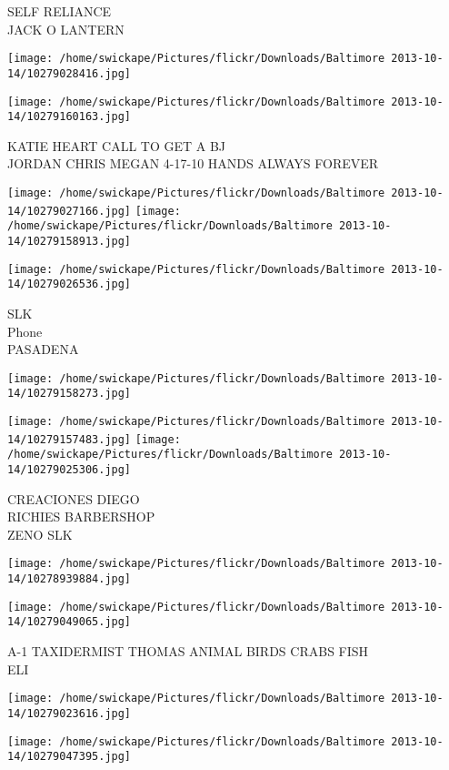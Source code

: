\documentclass[10pt,letterpaper]{article}
\begin{document}
SELF RELIANCE\\
JACK O LANTERN
\pagebreak

\texttt{[image: /home/swickape/Pictures/flickr/Downloads/Baltimore 2013-10-14/10279028416.jpg]}

\vspace{0.25in}
\texttt{[image: /home/swickape/Pictures/flickr/Downloads/Baltimore 2013-10-14/10279160163.jpg]}

KATIE HEART CALL TO GET A BJ\\
JORDAN CHRIS MEGAN 4{-}17{-}10 HANDS ALWAYS FOREVER
\pagebreak

\texttt{[image: /home/swickape/Pictures/flickr/Downloads/Baltimore 2013-10-14/10279027166.jpg]}
\texttt{[image: /home/swickape/Pictures/flickr/Downloads/Baltimore 2013-10-14/10279158913.jpg]}

\texttt{[image: /home/swickape/Pictures/flickr/Downloads/Baltimore 2013-10-14/10279026536.jpg]}

SLK\\
Phone\\
PASADENA
\pagebreak

\texttt{[image: /home/swickape/Pictures/flickr/Downloads/Baltimore 2013-10-14/10279158273.jpg]}

\vspace{0.25in}
\texttt{[image: /home/swickape/Pictures/flickr/Downloads/Baltimore 2013-10-14/10279157483.jpg]}
\texttt{[image: /home/swickape/Pictures/flickr/Downloads/Baltimore 2013-10-14/10279025306.jpg]}

CREACIONES DIEGO\\
RICHIES BARBERSHOP\\
ZENO SLK
\pagebreak

\texttt{[image: /home/swickape/Pictures/flickr/Downloads/Baltimore 2013-10-14/10278939884.jpg]}

\vspace{0.25in}
\texttt{[image: /home/swickape/Pictures/flickr/Downloads/Baltimore 2013-10-14/10279049065.jpg]}

A{-}1 TAXIDERMIST THOMAS ANIMAL BIRDS CRABS FISH\\
ELI
\pagebreak

\texttt{[image: /home/swickape/Pictures/flickr/Downloads/Baltimore 2013-10-14/10279023616.jpg]}

\vspace{0.25in}
\texttt{[image: /home/swickape/Pictures/flickr/Downloads/Baltimore 2013-10-14/10279047395.jpg]}
\end{document}

